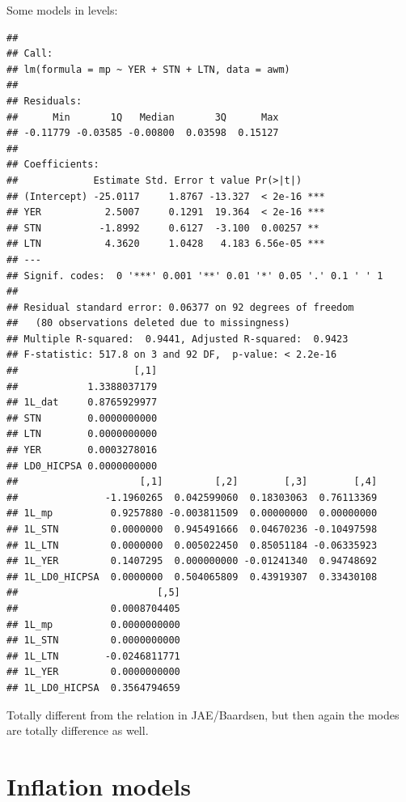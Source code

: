 \documentclass[11pt,oneside, a4paper]{amsart}\usepackage[]{graphicx}\usepackage[]{color}
\makeatletter
\newenvironment{kframe}{%
 \def\at@end@of@kframe{}%
 \ifinner\ifhmode%
  \def\at@end@of@kframe{\end{minipage}}%
  \begin{minipage}{\columnwidth}%
 \fi\fi%
 \def\FrameCommand##1{\hskip\@totalleftmargin \hskip-\fboxsep
 \colorbox{shadecolor}{##1}\hskip-\fboxsep
     \hskip-\linewidth \hskip-\@totalleftmargin \hskip\columnwidth}%
 \MakeFramed {\advance\hsize-\width
   \@totalleftmargin\z@ \linewidth\hsize
   \@setminipage}}%
 {\par\unskip\endMakeFramed%
 \at@end@of@kframe}
\newenvironment{knitrout}{}{} %
\makeatother
\begin{document}
Some models in levels:
\begin{knitrout}
\color{fgcolor}\begin{kframe}
\begin{verbatim}
## 
## Call:
## lm(formula = mp ~ YER + STN + LTN, data = awm)
## 
## Residuals:
##      Min       1Q   Median       3Q      Max 
## -0.11779 -0.03585 -0.00800  0.03598  0.15127 
## 
## Coefficients:
##             Estimate Std. Error t value Pr(>|t|)    
## (Intercept) -25.0117     1.8767 -13.327  < 2e-16 ***
## YER           2.5007     0.1291  19.364  < 2e-16 ***
## STN          -1.8992     0.6127  -3.100  0.00257 ** 
## LTN           4.3620     1.0428   4.183 6.56e-05 ***
## ---
## Signif. codes:  0 '***' 0.001 '**' 0.01 '*' 0.05 '.' 0.1 ' ' 1
## 
## Residual standard error: 0.06377 on 92 degrees of freedom
##   (80 observations deleted due to missingness)
## Multiple R-squared:  0.9441,	Adjusted R-squared:  0.9423 
## F-statistic: 517.8 on 3 and 92 DF,  p-value: < 2.2e-16
##                    [,1]
##            1.3388037179
## 1L_dat     0.8765929977
## STN        0.0000000000
## LTN        0.0000000000
## YER        0.0003278016
## LD0_HICPSA 0.0000000000
##                     [,1]         [,2]        [,3]        [,4]
##               -1.1960265  0.042599060  0.18303063  0.76113369
## 1L_mp          0.9257880 -0.003811509  0.00000000  0.00000000
## 1L_STN         0.0000000  0.945491666  0.04670236 -0.10497598
## 1L_LTN         0.0000000  0.005022450  0.85051184 -0.06335923
## 1L_YER         0.1407295  0.000000000 -0.01241340  0.94748692
## 1L_LD0_HICPSA  0.0000000  0.504065809  0.43919307  0.33430108
##                        [,5]
##                0.0008704405
## 1L_mp          0.0000000000
## 1L_STN         0.0000000000
## 1L_LTN        -0.0246811771
## 1L_YER         0.0000000000
## 1L_LD0_HICPSA  0.3564794659
\end{verbatim}
\end{kframe}
\end{knitrout}
Totally different from the relation in JAE/Baardsen, but then again the modes are totally difference as well.

\section{Inflation models}
\end{document}
